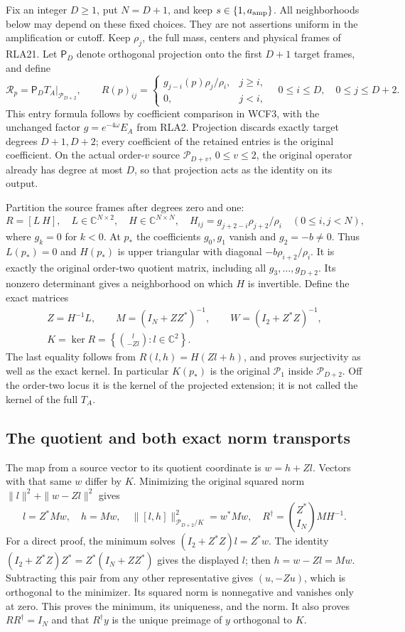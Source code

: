 \documentclass[11pt]{article}
\begin{document}
Fix an integer $D\ge1$, put $N=D+1$, and keep $s\in\{1,a_{\rm amp}\}$.
All neighborhoods below may depend on these fixed choices.  They are
not assertions uniform in the amplification or cutoff.
Keep $\rho_j$, the full mass, centers and physical frames of RLA21.
Let $\mathsf P_D$ denote orthogonal projection onto the first $D+1$
target frames, and define
\[
 \mathscr R_p=\mathsf P_D T_A|_{\mathcal P_{D+2}},\qquad
 R(p)_{ij}=\begin{cases}g_{j-i}(p)\rho_j/\rho_i,&j\ge i,\\
 0,&j<i,\end{cases}
 \quad 0\le i\le D,\quad0\le j\le D+2.
 \tag{RQT1}
\]
This entry formula follows by coefficient comparison in WCF3,
with the unchanged factor $g=e^{-4\omega}E_A$ from RLA2.
Projection discards exactly target degrees $D+1,D+2$; every
coefficient of the retained entries is the original coefficient.
On the actual order-$v$ source $\mathcal P_{D+v}$, $0\le v\le2$,
the original operator already has degree at most $D$, so that
projection acts as the identity on its output.

Partition the source frames after degrees zero and one:
\[
 R=[L\ H],\quad L\in\mathbb C^{N\times2},\quad
 H\in\mathbb C^{N\times N},\quad
 H_{ij}=g_{j+2-i}\rho_{j+2}/\rho_i\quad(0\le i,j<N),
 \tag{RQT2}
\]
where $g_k=0$ for $k<0$.  At $p_*$ the coefficients $g_0,g_1$
vanish and $g_2=-b\ne0$.  Thus $L(p_*)=0$ and $H(p_*)$ is
upper triangular with diagonal $-b\rho_{i+2}/\rho_i$.
It is exactly the original order-two quotient matrix, including
all $g_3,\ldots,g_{D+2}$.  Its nonzero determinant gives a
neighborhood on which $H$ is invertible.  Define the exact matrices
\[
 \begin{gathered}Z=H^{-1}L,\qquad M=(I_N+ZZ^*)^{-1},\qquad
 W=(I_2+Z^*Z)^{-1},\\
 K=\ker R=\left\{\binom{l}{-Zl}:l\in\mathbb C^2\right\}.
 \end{gathered}\tag{RQT3}
\]
The last equality follows from $R(l,h)=H(Zl+h)$, and proves
surjectivity as well as the exact kernel.  In particular $K(p_*)$
is the original $\mathcal P_1$ inside $\mathcal P_{D+2}$.
Off the order-two locus it is the kernel of the projected extension;
it is not called the kernel of the full $T_A$.

\subsection{The quotient and both exact norm transports}
The map from a source vector to its quotient coordinate is
$w=h+Zl$.  Vectors with that same $w$ differ by $K$.
Minimizing the original squared norm
$\|l\|^2+\|w-Zl\|^2$ gives
\[
 l=Z^*Mw,\quad h=Mw,\quad
 \|[l,h]\|_{\mathcal P_{D+2}/K}^2=w^*Mw,\quad
 R^\dagger=\binom{Z^*}{I_N}MH^{-1}.
 \tag{RQT4}
\]
For a direct proof, the minimum solves
$(I_2+Z^*Z)l=Z^*w$.  The identity
$(I_2+Z^*Z)Z^*=Z^*(I_N+ZZ^*)$ gives the displayed $l$;
then $h=w-Zl=Mw$.  Subtracting this pair from any other
representative gives $(u,-Zu)$, which is orthogonal to the
minimizer.  Its squared norm is nonnegative and vanishes only
at zero.  This proves the minimum, its uniqueness, and the norm.
It also proves $RR^\dagger=I_N$ and that $R^\dagger y$ is
the unique preimage of $y$ orthogonal to $K$.
\end{document}
